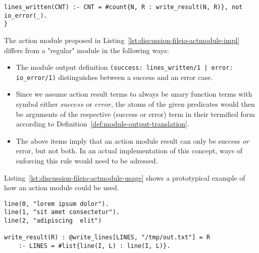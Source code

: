 \begin{example}
\begin{lstlisting}[style=asp-code, label={lst:discussion-fileio-actmodule-impl}, caption={Prototypical definition of a module containing Evolog actions.}]
	lines_written(CNT) :- CNT = #count{N, R : write_result(N, R)}, not io_error(_).		
}	
\end{lstlisting}	
The action module proposed in Listing~\ref{lst:discussion-fileio-actmodule-impl} differs from a "regular" module in the following ways:
\begin{itemize}
	\item The module output definition \texttt{(success: lines\_written/1 | error: io\_error/1)} distinguishes between a success and an error case. 
	\item Since we assume action result terms to always be unary function terms with symbol either $\mathit{success}$ or $\mathit{error}$, the atoms of the given predicates would then be arguments of the respective (success or error) term in their termified form according to Definition~\ref{def:module-output-translation}.
	\item The above items imply that an action module result can only be success \emph{or} error, but not both. In an actual implementation of this concept, ways of enforcing this rule would need to be adressed. 
\end{itemize}
Listing~\ref{lst:discussion-fileio-actmodule-usage} shows a prototypical example of how an action module could be used.
\begin{lstlisting}[style=asp-code, label={lst:discussion-fileio-actmodule-usage}, caption={Prototypical usage of an action module providing an abstraction to write content to a file.}]
line(0, "lorem ipsum dolor").
line(1, "sit amet consectetur").
line(2, "adipiscing  elit")

write_result(R) : @write_lines[LINES, "/tmp/out.txt"] = R 
	:- LINES = #list{line(I, L) : line(I, L)}.
\end{lstlisting}		
\end{example}

